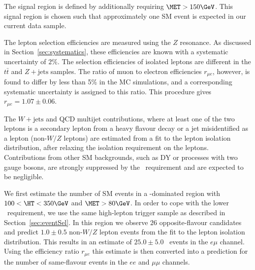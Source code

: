 The signal region is defined by additionally requiring $\MET>150\GeV$. 
This signal region is chosen such that approximately one SM event is expected in our 
current data sample. 

The  lepton   selection  efficiencies  are  measured   using  the  $Z$
resonance.    As   discussed   in  Section~\ref{sec:systematics},   these
efficiencies are  known with a  systematic uncertainty of  $2\%$.  The
selection efficiencies of isolated leptons are different in the $t\bar{t}$
and  $Z+\textrm{jets}$  samples.   The   ratio  of  muon  to  electron
efficiencies $r_{\mu{}e}$,  however, is found  to differ by  less than
5\%  in the MC simulations,  and  a corresponding  systematic
uncertainty is assigned to this ratio. This procedure gives $r_{\mu{}e} = 1.07 \pm
0.06$.

The $W+\textrm{jets}$ and QCD multijet  contributions, where at least one
of the two leptons is a  secondary lepton from a heavy flavour decay or
a jet misidentified as a lepton (non-$W/Z$ leptons) are estimated from
a  fit to the  lepton isolation distribution,  after relaxing
the  isolation requirement on  the leptons.   
Contributions from
other SM backgrounds,  such as DY or processes  with two gauge bosons,
are strongly suppressed  by the \MET\ requirement and  are expected to
be negligible.

We first estimate the number of SM events in a \ttbar-dominated region 
with $100 < \HT < 350\GeV$ and $\MET>80\GeV$. In order to cope with the lower \HT\ requirement,
we use the same high-\pt lepton trigger sample as described in Section~\ref{sec:eventSel}. 
In this region we observe $26$ opposite-flavour candidates and predict $1.0\pm0.5$ 
non-$W/Z$ lepton events from the fit to the lepton isolation distribution. This results in an 
estimate of $25.0 \pm 5.0$ \ttbar\ events in the $e\mu$ channel. Using the efficiency 
ratio  $r_{\mu{}e}$  this estimate is then converted into a prediction for the number
of same-flavour events in the $ee$ and $\mu\mu$ channels. 

